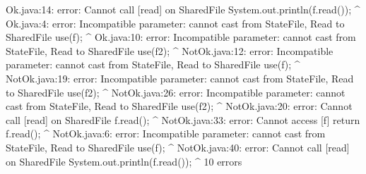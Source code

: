 \lstset{language=,caption=Our tool's output}
\begin{code}
Ok.java:14: error: Cannot call [read] on Shared{File}
    System.out.println(f.read());
                             ^
Ok.java:4: error: Incompatible parameter: cannot cast from State{File, Read} to Shared{File}
    use(f);
        ^
Ok.java:10: error: Incompatible parameter: cannot cast from State{File, Read} to Shared{File}
    use(f2);
        ^
NotOk.java:12: error: Incompatible parameter: cannot cast from State{File, Read} to Shared{File}
    use(f);
        ^
NotOk.java:19: error: Incompatible parameter: cannot cast from State{File, Read} to Shared{File}
    use(f2);
        ^
NotOk.java:26: error: Incompatible parameter: cannot cast from State{File, Read} to Shared{File}
    use(f2);
        ^
NotOk.java:20: error: Cannot call [read] on Shared{File}
    f.read();
          ^
NotOk.java:33: error: Cannot access [f]
      return f.read();
             ^
NotOk.java:6: error: Incompatible parameter: cannot cast from State{File, Read} to Shared{File}
    use(f);
        ^
NotOk.java:40: error: Cannot call [read] on Shared{File}
    System.out.println(f.read());
                             ^
10 errors
\end{code}

